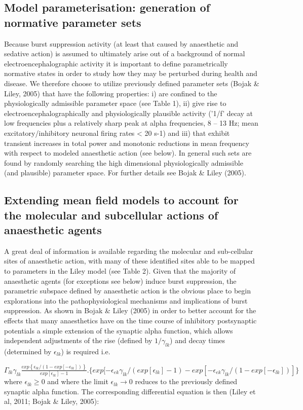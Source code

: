 \documentclass[a4paper,12pt]{article}
\begin{document}
\subsection{Model parameterisation: generation of normative parameter sets}
Because burst suppression activity (at least that caused by
anaesthetic and sedative action) is assumed to ultimately arise out of
a background of normal electroencephalographic activity it is
important to define parametrically normative states in order to study
how they may be perturbed during health and disease. We therefore
choose to utilize previously defined parameter sets (Bojak \& Liley,
2005) that have the following properties: i) are confined to the
physiologically admissible parameter space (see Table 1), ii) give rise
to electroencephalographically and physiologically plausible activity
('1/f' decay at low frequencies plus a relatively sharp peak at alpha
frequencies, 8 – 13 Hz; mean excitatory/inhibitory neuronal firing rates
< 20 s-1) and iii) that exhibit transient increases in total power and
monotonic reductions in mean frequency with respect to modeled
anaesthetic action (see below). In general such sets are found by
randomly searching the high dimensional physiologically admissible
(and plausible) parameter space. For further details see Bojak \& Liley
(2005).

\subsection{Extending mean field models to account for the molecular and subcellular
actions of anaesthetic agents}
A great deal of information is available regarding the molecular and
sub-cellular sites of anaesthetic action, with many of these identified
sites able to be mapped to parameters in the Liley model (see Table
2). Given that the majority of anaesthetic agents (for exceptions see
below) induce burst suppression, the parametric subspace defined by
anaesthetic action is the obvious place to begin explorations into the
pathophysiological mechanisms and implications of burst suppression.
As shown in Bojak \& Liley (2005) in order to better account for the
effects that many anaesthetics have on the time course of inhibitory
postsynaptic potentials a simple extension of the synaptic alpha
function, which allows independent adjustments of the rise (defined by $1/\gamma_{lk}$)
and decay times (determined by $\epsilon_{lk}$) is required i.e.

$\Gamma_{lk}\gamma_{lk} \frac{exp\left\{\epsilon_{lk}/(1-exp[-\epsilon_{lk}])\right\} }{exp[\epsilon_{lk}] - 1}.\{exp[-\epsilon_{ek}\gamma_{lk}/(exp[\epsilon_{lk}] - 1) - exp[-\epsilon_{ek}\gamma_{lk}/(1 - exp[-\epsilon_{lk}])]\}$
\\
where $\epsilon_{lk} \ge 0$ and where the limit $\epsilon_{lk} \rightarrow 0$ reduces to the previously
defined synaptic alpha function. The corresponding differential
equation is then (Liley et al, 2011; Bojak \& Liley, 2005):
\end{document}
